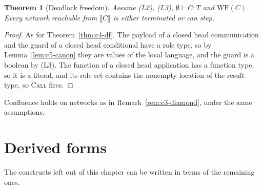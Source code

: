 \documentclass[11pt]{report}
\theoremstyle{plain}
\newtheorem{theorem}{Theorem}[chapter]
\theoremstyle{definition}
\theoremstyle{remark}
\newcommand{\WF}{\mathrm{WF}}
\newcommand{\projn}[1]{\llbracket #1 \rrbracket}
\newcommand{\rn}[1]{{\normalfont\scshape #1}}
\begin{document}
\begin{theorem}[Deadlock freedom]\label{thm:c5-df}
  Assume (L2), (L3), $\emptyset\vdash C:T$ and $\WF(C)$.  Every network
  reachable from $\projn{C}$ is either terminated or can step.
\end{theorem}
\begin{proof}
  As for Theorem~\ref{thm:c4-df}.  The payload of a closed head
  communication and the guard of a closed head conditional have a role type,
  so by Lemma~\ref{lem:c5-canon} they are values of the local language, and
  the guard is a boolean by (L3).  The function of a closed head
  application has a function type, so it is a literal, and its role set
  contains the nonempty location of the result type, so \rn{Call} fires.
\end{proof}

Confluence holds on networks as in Remark~\ref{rem:c3-diamond}, under the
same assumptions.

\section{Derived forms}
\label{sec:c5-derived}

The constructs left out of this chapter can be written in terms of the
remaining ones.
\end{document}
